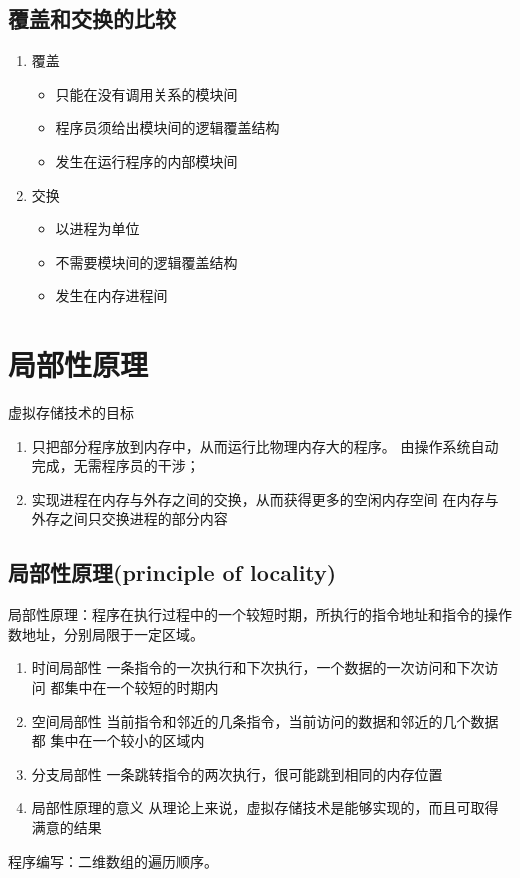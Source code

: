 \subsection{覆盖和交换的比较}
\begin{enumerate}
	\item 覆盖
	\begin{itemize}
		\item 只能在没有调用关系的模块间
		\item 程序员须给出模块间的逻辑覆盖结构
		\item 发生在运行程序的内部模块间
	\end{itemize}
	\item 交换
	\begin{itemize}
		\item 以进程为单位
		\item 不需要模块间的逻辑覆盖结构
		\item 发生在内存进程间
	\end{itemize}
\end{enumerate}

\section{局部性原理}
虚拟存储技术的目标
\begin{enumerate}
	\item 只把部分程序放到内存中，从而运行比物理内存大的程序。
	\subitem 由操作系统自动完成，无需程序员的干涉；
	\item 实现进程在内存与外存之间的交换，从而获得更多的空闲内存空间
	\subitem 在内存与外存之间只交换进程的部分内容
\end{enumerate}
\subsection{局部性原理(principle of locality)}
局部性原理：程序在执行过程中的一个较短时期，所执行的指令地址和指令的操作数地址，分别局限于一定区域。
\begin{enumerate}
	\item 时间局部性
	\subitem 一条指令的一次执行和下次执行，一个数据的一次访问和下次访问
	都集中在一个较短的时期内
	\item 空间局部性
	\subitem 当前指令和邻近的几条指令，当前访问的数据和邻近的几个数据都
	集中在一个较小的区域内
	\item 分支局部性
	\subitem 一条跳转指令的两次执行，很可能跳到相同的内存位置
	\item 局部性原理的意义
	\subitem 从理论上来说，虚拟存储技术是能够实现的，而且可取得满意的结果
\end{enumerate}
程序编写：二维数组的遍历顺序。

